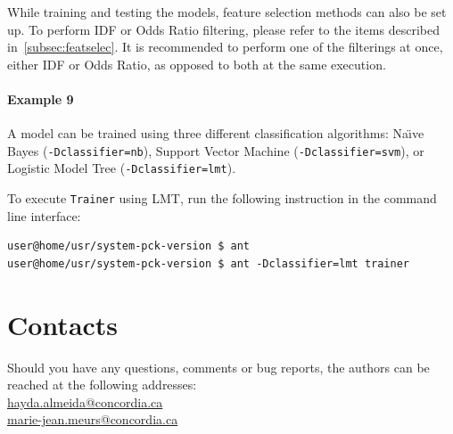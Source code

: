 \documentclass[11pt]{article}
\begin{document}
While training and testing the models, feature selection methods can also be set up.
To perform IDF or Odds Ratio filtering, please refer to the items described in~\ref{subsec:featselec}.
It is recommended to perform one of the filterings at once, either IDF or Odds Ratio,
as opposed to both at the same execution.

\paragraph{Example 9}
A model can be trained using three different classification algorithms: 
{Na\"{\i}ve} Bayes (\texttt{-Dclassifier=nb}), Support Vector Machine (\texttt{-Dclassifier=svm}), or Logistic Model Tree (\texttt{-Dclassifier=lmt}).

To execute \texttt{Trainer} using LMT, run the following instruction in the command line interface:
\begin{lstlisting}
user@home/usr/system-pck-version $ ant
user@home/usr/system-pck-version $ ant -Dclassifier=lmt trainer
\end{lstlisting}


\section{Contacts}
Should you have any questions, comments or bug reports, the authors can be reached at the following addresses:\\
\url{hayda.almeida@concordia.ca} \\
\url{marie-jean.meurs@concordia.ca}


\appendix




\end{document}
